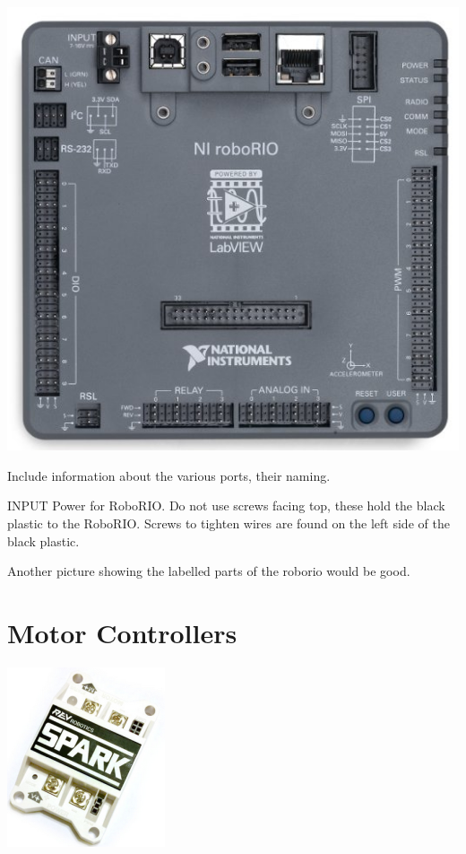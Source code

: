 \documentclass[letterpaper,10pt]{memoir}
\begin{document}
\includegraphics[width=\textwidth]{images/ni_roborio}

Include information about the various ports, their naming.

INPUT Power for RoboRIO. Do not use screws facing top, these hold the black plastic to the RoboRIO. Screws to tighten wires are found on the left side of the black plastic.

Another picture showing the labelled parts of the roborio would be good.


\newpage\section*{Motor Controllers}

\includegraphics[width=.25\textwidth]{images/spark}
\end{document}

